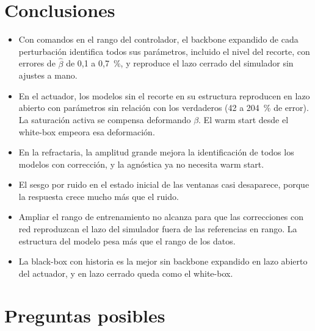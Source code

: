 \documentclass[10pt,a4paper]{article}
\newcommand{\bh}{\hat\beta}
\begin{document}
\section{Conclusiones}

\begin{itemize}[leftmargin=*,itemsep=0.4em]
\item Con comandos en el rango del controlador, el backbone expandido de cada perturbación identifica todos sus parámetros, incluido el nivel del recorte, con errores de $\bh$ de 0,1 a 0,7~\%, y reproduce el lazo cerrado del simulador sin ajustes a mano.
\item En el actuador, los modelos sin el recorte en su estructura reproducen en lazo abierto con parámetros sin relación con los verdaderos (42 a 204~\% de error). La saturación activa se compensa deformando $\beta$. El warm start desde el white-box empeora esa deformación.
\item En la refractaria, la amplitud grande mejora la identificación de todos los modelos con corrección, y la agnóstica ya no necesita warm start.
\item El sesgo por ruido en el estado inicial de las ventanas casi desaparece, porque la respuesta crece mucho más que el ruido.
\item Ampliar el rango de entrenamiento no alcanza para que las correcciones con red reproduzcan el lazo del simulador fuera de las referencias en rango. La estructura del modelo pesa más que el rango de los datos.
\item La black-box con historia es la mejor sin backbone expandido en lazo abierto del actuador, y en lazo cerrado queda como el white-box.
\end{itemize}

\section{Preguntas posibles}
\end{document}
